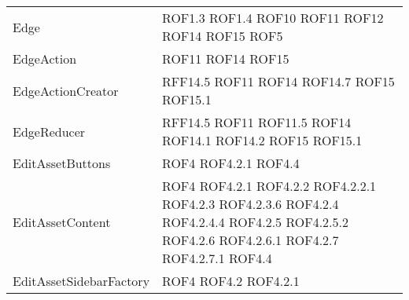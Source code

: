 \begin{longtable}{p{5cm}!{\VRule[1pt]}p{2.5cm}}
	Edge & ROF1.3 \newline ROF1.4 \newline ROF10 \newline ROF11 \newline ROF12 \newline ROF14 \newline ROF15 \newline ROF5\\
	EdgeAction & ROF11 \newline ROF14 \newline ROF15\\
	EdgeActionCreator & RFF14.5 \newline ROF11 \newline ROF14 \newline ROF14.7 \newline ROF15 \newline ROF15.1\\
	EdgeReducer & RFF14.5 \newline ROF11 \newline ROF11.5 \newline ROF14 \newline ROF14.1 \newline ROF14.2 \newline ROF15 \newline ROF15.1\\
	EditAssetButtons & ROF4 \newline ROF4.2.1 \newline ROF4.4\\
	EditAssetContent & ROF4 \newline ROF4.2.1 \newline ROF4.2.2 \newline ROF4.2.2.1 \newline ROF4.2.3 \newline ROF4.2.3.6 \newline ROF4.2.4 \newline ROF4.2.4.4 \newline ROF4.2.5 \newline ROF4.2.5.2 \newline ROF4.2.6 \newline ROF4.2.6.1 \newline ROF4.2.7 \newline ROF4.2.7.1 \newline ROF4.4\\
	EditAssetSidebarFactory & ROF4 \newline ROF4.2 \newline ROF4.2.1\\

\end{longtable}
